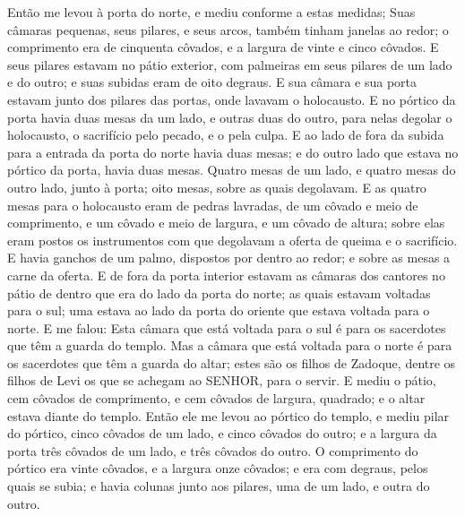 {Então me levou à porta do norte, e mediu conforme a estas medidas;
Suas câmaras pequenas, seus pilares, e seus arcos, também tinham janelas ao redor; o comprimento era de cinquenta côvados, e a largura de vinte e cinco côvados.
E seus pilares estavam no pátio exterior, com palmeiras em seus pilares de um lado e do outro; e suas subidas eram de oito degraus.
E sua câmara e sua porta estavam junto dos pilares das portas, onde lavavam o holocausto.
E no pórtico da porta havia duas mesas da um lado, e outras duas do outro, para nelas degolar o holocausto, o sacrifício pelo pecado, e o
{} pela culpa.
E ao lado de fora da subida para a entrada da porta do norte havia duas mesas; e do outro lado que estava no pórtico da porta, havia duas mesas.
Quatro mesas de um lado, e quatro mesas do outro lado, junto à porta; oito mesas, sobre as quais degolavam.
E as quatro mesas para o holocausto eram de pedras lavradas, de um côvado e meio de comprimento, e um côvado e meio de largura, e um côvado de altura; sobre elas eram postos os instrumentos com que degolavam a oferta de queima e o sacrifício.
E havia ganchos de um palmo, dispostos por dentro ao redor; e sobre as mesas a carne da oferta.
E de fora da porta interior estavam as câmaras dos cantores no pátio de dentro que era do lado da porta do norte; as quais estavam voltadas para o sul; uma estava ao lado da porta do oriente que estava voltada para o norte.
E me falou: Esta câmara que está voltada para o sul é para os sacerdotes que têm a guarda do templo.
Mas a câmara que está voltada para o norte é para os sacerdotes que têm a guarda do altar; estes são os filhos de Zadoque, dentre os filhos de Levi os que se achegam ao SENHOR, para o servir.
E mediu o pátio, cem côvados de comprimento, e cem côvados de largura, quadrado; e o altar estava diante do templo.
Então ele me levou ao pórtico do templo, e mediu
{} pilar do pórtico, cinco côvados de um lado, e cinco côvados do outro; e a largura da porta
{} três côvados de um lado, e três côvados do outro.
O comprimento do pórtico era vinte côvados, e a largura onze côvados; e era com degraus, pelos quais se subia; e havia colunas junto aos pilares, uma de um lado, e outra do outro.

}
